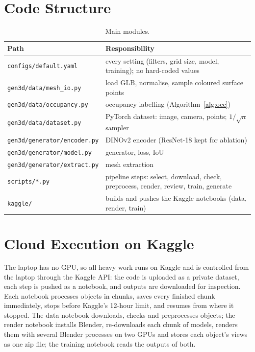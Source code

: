\section{Code Structure}
\begin{table}[H]
\centering
\caption{Main modules.}
\small
\begin{tabularx}{\textwidth}{lX}
\toprule
Path & Responsibility \\
\midrule
\texttt{configs/default.yaml} & every setting (filters, grid size, model, training); no hard-coded values \\
\texttt{gen3d/data/mesh\_io.py} & load GLB, normalise, sample coloured surface points \\
\texttt{gen3d/data/occupancy.py} & occupancy labelling (Algorithm~\ref{alg:occ}) \\
\texttt{gen3d/data/dataset.py} & PyTorch dataset: image, camera, points; $1/\sqrt{n}$ sampler \\
\texttt{gen3d/generator/encoder.py} & DINOv2 encoder (ResNet-18 kept for ablation) \\
\texttt{gen3d/generator/model.py} & generator, loss, IoU \\
\texttt{gen3d/generator/extract.py} & mesh extraction \\
\texttt{scripts/*.py} & pipeline steps: select, download, check, preprocess, render, review, train, generate \\
\texttt{kaggle/} & builds and pushes the Kaggle notebooks (data, render, train) \\
\bottomrule
\end{tabularx}
\end{table}

\section{Cloud Execution on Kaggle}
The laptop has no GPU, so all heavy work runs on Kaggle and is controlled from the laptop through the Kaggle API: the code is uploaded as a private dataset, each step is pushed as a notebook, and outputs are downloaded for inspection. Each notebook processes objects in chunks, saves every finished chunk immediately, stops before Kaggle's 12-hour limit, and resumes from where it stopped. The data notebook downloads, checks and preprocesses objects; the render notebook installs Blender, re-downloads each chunk of models, renders them with several Blender processes on two GPUs and stores each object's views as one zip file; the training notebook reads the outputs of both.

